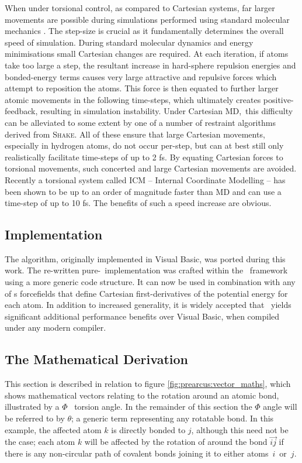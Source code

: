 When under torsional control, as compared to Cartesian systems, far larger movements are possible during simulations performed using standard molecular mechanics \forcefields. The step-size is crucial as it fundamentally determines the overall speed of simulation. During standard molecular dynamics and energy minimisations small Cartesian changes are required. At each iteration, if atoms take too large a step, the resultant increase in hard-sphere repulsion energies and bonded-energy terms causes very large attractive and repulsive forces which attempt to reposition the atoms. This force is then equated to further larger atomic movements in the following time-steps, which ultimately creates positive-feedback, resulting in simulation instability.
Under Cartesian MD,\ this difficulty can be alleviated to some extent by one of a number of restraint algorithms derived from \textsc{Shake}\cite{SIMULATION:SHAKE}. All of these ensure that large Cartesian movements, especially in hydrogen atoms, do not occur per-step, but can at best still only realistically facilitate time-steps of up to 2 fs. By equating Cartesian forces to torsional movements, such concerted and large Cartesian movements are avoided.
Recently a torsional system called ICM\cite{SIMULATION:ICM} -- Internal Coordinate Modelling --  has been shown to be up to an order of magnitude faster than MD and can use a time-step of up to 10 fs.
The benefits of such a speed increase are obvious.

\subsection{Implementation}

The algorithm, originally implemented in Visual Basic, was ported during this work. The re-written pure-\CPP\  implementation was  crafted within the \pd\ framework using a more generic code structure. It can now be used in combination with any of \pd s forcefields that define Cartesian first-derivatives of the potential energy for each atom.
In addition to increased generality, it is widely accepted that \CPP\ yields significant additional performance benefits over Visual Basic, when compiled under any modern compiler. 

\subsection{The Mathematical Derivation}

This section is described in relation to figure \ref{fig:prearcus:vector_maths}, which shows mathematical vectors relating to the rotation around an atomic bond, illustrated by a $\Phi$ \mainchain\ torsion angle. In the remainder of this section the $\Phi$ angle will be referred to by $\theta$; a generic term representing any rotatable bond. In this example, the affected atom $k$ is directly bonded to $j$, although this need not be the case; each atom $k$ will be affected by the rotation of around the bond $\vec{ij}$ if there is any non-circular path of covalent bonds joining it to either \mbox{atoms $i$ or $j$}.

